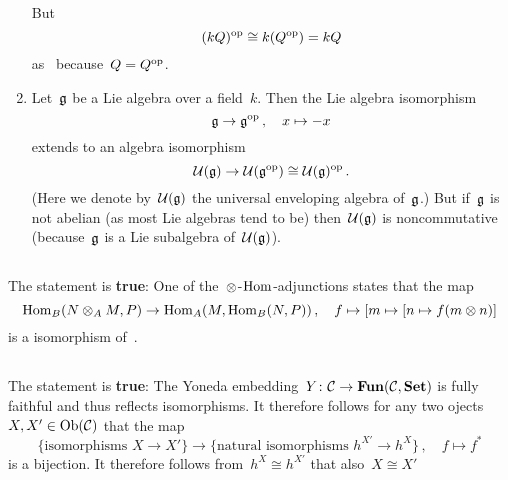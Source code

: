 \begin{enumerate}
    But
    \[
            (kQ)^{\mathrm{op}}
      \cong k(Q^{\mathrm{op}})
      =     kQ
    \]
    as~{\kalgs} because~$Q = Q^{\mathrm{op}}$.
  \item
    Let~$\mathfrak{g}$ be a Lie algebra over a field~$k$.
    Then the Lie algebra isomorphism
    \[
              \mathfrak{g}
      \to     \mathfrak{g}^{\mathrm{op}} \,,
      \quad   x
      \mapsto -x
    \]
    extends to an algebra isomorphism
    \[
            \mathcal{U}(\mathfrak{g})
      \to   \mathcal{U}(\mathfrak{g}^{\mathrm{op}})
      \cong \mathcal{U}(\mathfrak{g})^{\mathrm{op}} \,.
    \]
    (Here we denote by~$\mathcal{U}(\mathfrak{g})$ the universal enveloping algebra of~$\mathfrak{g}$.)
    But if~$\mathfrak{g}$ is not abelian (as most Lie algebras tend to be) then~$\mathcal{U}(\mathfrak{g})$ is noncommutative (because~$\mathfrak{g}$ is a Lie subalgebra of~$\mathcal{U}(\mathfrak{g})$).
\end{enumerate}





\subsection{}

The statement is \textbf{true}:
One of the~$\otimes$\nobreakdash-$\operatorname{Hom}$\nobreakdash-adjunctions states that the map
\[
          \operatorname{Hom}_B(N \otimes_A M, P)
  \to     \operatorname{Hom}_A(M, \operatorname{Hom}_B(N, P)) \,,
  \quad   f
  \mapsto [m \mapsto [n \mapsto f(m \otimes n)]
\]
is a {\welldef} isomorphism of~{\kvs}.





\subsection{}

The statement is \textbf{true}:
The Yoneda embedding~$Y \colon \mathcal{C} \to \mathbf{Fun}(\mathcal{C}, \mathbf{Set})$ is fully faithful and thus reflects isomorphisms.
It therefore follows for any two ojects~$X, X' \in \operatorname{Ob}(\mathcal{C})$ that the map
\[
        \{\text{isomorphisms~$X \to X'$}\}
  \to   \{\text{natural isomorphisms~$h^{X'} \to h^X$}\} \,,
  \quad f
  \mapsto f^*
\]
is a {\welldef} bijection.
It therefore follows from~$h^X \cong h^{X'}$ that also~$X \cong X'$





\subsection{}

